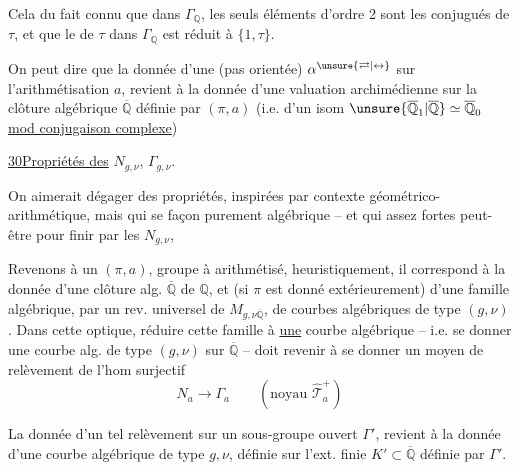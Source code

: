 

Cela  du fait connu que dans $\Gamma_{\mathbb Q}$, les seuls éléments d'ordre 2 sont les conjugués de $\tau$, et que le  de $\tau$ dans $\Gamma_{\mathbb Q}$ est réduit à $\{1,\tau\}$.

On peut dire que la donnée d'une  (pas orientée) $\alpha^{\unsure{\rightleftarrows|\leftrightarrow}}$ sur l'arithmétisation $a$, revient à la donnée d'une  valuation archimédienne sur la clôture algébrique $\overline{\mathbb Q}$  définie par $(\pi,a)$ (i.e. d'un isom $\unsure{\overline{\mathbb Q}_1|\overline{\mathbb Q}}\simeq\overline{\mathbb Q}_0$ \uline{mod conjugaison complexe})




\uline{30}\quad \uline{Propriétés des} $N_{g,\nu}$, $\Gamma_{g,\nu}$.

On aimerait dégager des propriétés, inspirées par  contexte géométrico-arithmétique, mais qui  se   façon purement algébrique -- et qui  assez fortes peut-être pour finir par  les $N_{g,\nu}$, 

Revenons à un $(\pi,a)$, groupe à  arithmétisé, heuristiquement, il correspond à la donnée d'une clôture alg. $\overline{\mathbb Q}$ de $\mathbb Q$, et (si $\pi$ est donné extérieurement) d'une famille algébrique,  par un rev. universel  de $M_{g,\nu\overline{\mathbb Q}}$, de courbes algébriques de type $(g,\nu)$. Dans cette optique, réduire cette famille à \uline{une} courbe algébrique -- i.e. se donner une courbe alg. de type $(g,\nu)$ sur $\overline{\mathbb Q}$ -- doit revenir à se donner un moyen de relèvement de l'hom surjectif
\[
 N_a\longrightarrow\Gamma_a
 \qquad (\text{noyau }\widehat{\mathcal T}_a^+)
 \tag{1}
\]


La donnée d'un tel relèvement sur un sous-groupe ouvert $\Gamma'$, revient à la donnée d'une courbe algébrique de type $g,\nu$, définie sur l'ext. finie $K'\subset\overline{\mathbb Q}$ définie par $\Gamma'$.

